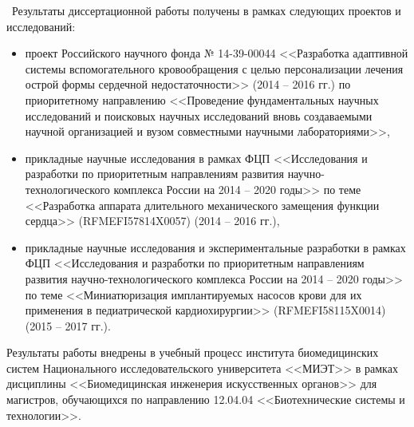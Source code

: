 \implement\
Результаты диссертационной работы получены в рамках следующих проектов и исследований:

\begin{itemize}
 \item проект Российского научного фонда № 14-39-00044 <<Разработка адаптивной системы вспомогательного кровообращения с целью персонализации лечения острой формы сердечной недостаточности>> (2014 -- 2016 гг.) по приоритетному направлению <<Проведение фундаментальных научных исследований и поисковых научных исследований вновь создаваемыми научной организацией и вузом совместными научными лабораториями>>,
 \item прикладные научные исследования в рамках ФЦП <<Исследования и разработки по приоритетным направлениям развития научно-технологического комплекса России на 2014 – 2020 годы>> по теме <<Разработка аппарата длительного механического замещения функции сердца>> (RFMEFI57814X0057) (2014 -- 2016 гг.),
 \item прикладные научные исследования и экспериментальные разработки в рамках ФЦП <<Исследования и разработки по приоритетным направлениям развития научно-технологического комплекса России на 2014 – 2020 годы>> по теме <<Миниатюризация имплантируемых насосов крови для их применения в педиатрической кардиохирургии>> (RFMEFI58115X0014) (2015 -- 2017 гг.).
\end{itemize}

Результаты работы внедрены в учебный процесс института биомедицинских систем Национального исследовательского университета <<МИЭТ>> в рамках дисциплины <<Биомедицинская инженерия искусственных органов>> для магистров, обучающихся по направлению 12.04.04 <<Биотехнические системы и технологии>>.




